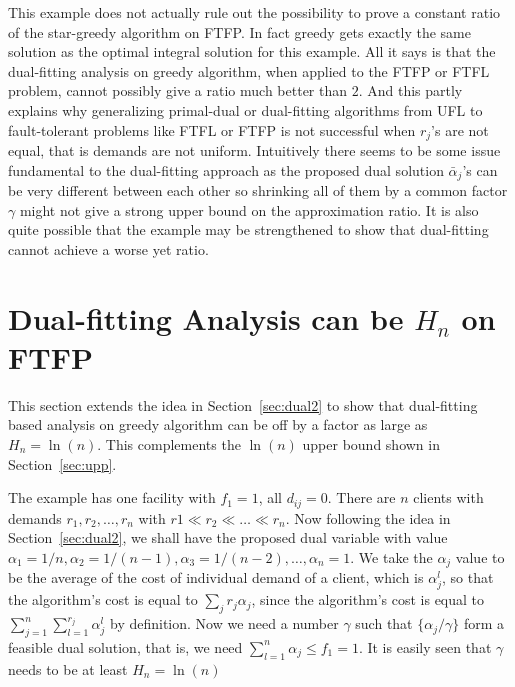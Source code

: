 \documentclass{article}
\begin{document}
This example does not actually rule out the possibility to prove a
constant ratio of the star-greedy algorithm on FTFP. In fact greedy
gets exactly the same solution as the optimal integral solution for
this example. All it says is that the dual-fitting analysis on greedy
algorithm, when applied to the FTFP or FTFL problem, cannot possibly
give a ratio much better than $2$. And this partly explains why
generalizing primal-dual or dual-fitting algorithms from UFL to
fault-tolerant problems like FTFL or FTFP is not successful when
$r_j$'s are not equal, that is demands are not uniform. Intuitively
there seems to be some issue fundamental to the dual-fitting approach
as the proposed dual solution $\bar\alpha_j$'s can be very different
between each other so shrinking all of them by a common factor
$\gamma$ might not give a strong upper bound on the approximation
ratio. It is also quite possible that the example may be strengthened
to show that dual-fitting cannot achieve a worse yet ratio.

\section{Dual-fitting Analysis can be $H_n$ on FTFP}
This section extends the idea in Section~\ref{sec:dual2} to show that
dual-fitting based analysis on greedy algorithm can be off by a factor
as large as $H_n = \ln(n)$. This complements the $\ln(n)$ upper bound
shown in Section~\ref{sec:upp}.

The example has one facility with $f_1 = 1$, all $d_{ij}=0$. There are
$n$ clients with demands $r_1, r_2, \ldots, r_n$ with $r1 \ll r_2 \ll
\ldots \ll r_n$. Now following the idea in Section~\ref{sec:dual2}, we
shall have the proposed dual variable with value $\alpha_1=1/n,
\alpha_2 = 1/(n-1), \alpha_3 = 1/(n-2), \ldots, \alpha_n = 1$. We take
the $\alpha_j$ value to be the average of the cost of individual
demand of a client, which is $\alpha_j^l$, so that the algorithm's
cost is equal to $\sum_{j} r_j\alpha_j$, since the algorithm's cost is
equal to $\sum_{j=1}^n \sum_{l=1}^{r_j} \alpha_j^l$ by definition. Now
we need a number $\gamma$ such that $\{\alpha_j/\gamma\}$ form a
feasible dual solution, that is, we need $\sum_{l=1}^n \alpha_j \leq
f_1 = 1$. It is easily seen that $\gamma$ needs to be at least $H_n =
\ln(n)$
\end{document}
